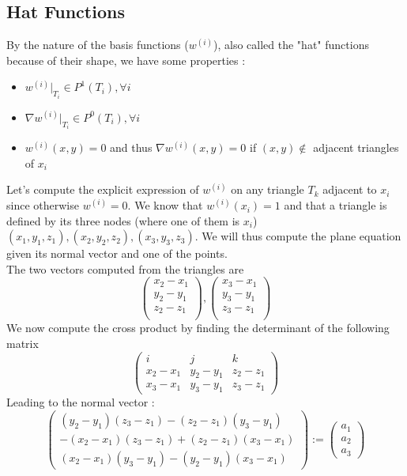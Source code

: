 \documentclass[a4paper]{report}
\begin{document}
\subsection{Hat Functions}
By the nature of the basis functions ($w^{(i)}$), also called the "hat" functions because of their shape, we have some properties : 
\begin{itemize}
\item $w^{(i)}|_{T_i} \in P^1(T_i),\forall i$ 
\item $\nabla w^{(i)}|_{T_i} \in P^0(T_i), \forall i$
\item $w^{(i)}(x,y) =0$ and thus $\nabla w^{(i)}(x,y)=0$ if $(x,y) \not \in $ adjacent triangles of $x_i$ 
\end{itemize}
Let's compute the explicit expression of $w^{(i)}$ on any triangle $T_k$ adjacent to $x_{i}$ since otherwise $w^{(i)}=0$. We know that  $w^{(i)}(x_{i})=1$ and that a triangle is defined by its three nodes (where one of them is $x_i$) $(x_1,y_1,z_1),(x_2,y_2,z_2),(x_3,y_3,z_3)$. We will thus compute the plane equation given its normal vector and one of the points.
\\
The two vectors computed from the triangles are
\[
\left(
\begin{matrix}
x_2-x_1\\
y_2-y_1\\
z_2-z_1\\
\end{matrix}
\right),
\left(
\begin{matrix}
x_3-x_1\\
y_3-y_1\\
z_3-z_1\\
\end{matrix}
\right)
\]
We now compute the cross product by finding the determinant of the following matrix
\[
\left(
\begin{matrix}
i & j & k\\
x_2-x_1&y_2-y_1&z_2-z_1\\
x_3-x_1&y_3-y_1&z_3-z_1
\end{matrix}
\right)
\]
Leading to the normal vector :
\[
\left(
\begin{matrix}
(y_2-y_1)(z_3-z_1)-(z_2-z_1)(y_3-y_1)\\
-(x_2-x_1)(z_3-z_1)+(z_2-z_1)(x_3-x_1)\\
(x_2-x_1)(y_3-y_1)-(y_2-y_1)(x_3-x_1)
\end{matrix}
\right):=
\left(
\begin{matrix}
a_1\\
a_2\\
a_3
\end{matrix}
\right)
\]
\end{document}
